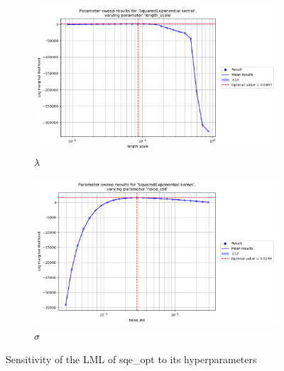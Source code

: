 \documentclass{article}
\begin{document}
\begin{figure}[pht]
\begin{subfigure}{0.45\textwidth}
        \includegraphics[width=\textwidth]{param_sweep/SquaredExponential/Parameter_sweep_results_for__SquaredExponential_kernel_,_varying_parameter__length_scale_.png}
        \caption{$\lambda$}
        \label{fig:sqe length scale}
    \end{subfigure}
    \begin{subfigure}{0.45\textwidth}
        \centering
        \includegraphics[width=\textwidth]{param_sweep/SquaredExponential/Parameter_sweep_results_for__SquaredExponential_kernel_,_varying_parameter__noise_std_.png}
        \caption{$\sigma$}
        \label{fig:sqe noise}
    \end{subfigure}

    \caption{Sensitivity of the LML of sqe\_opt to its hyperparameters}
    \label{fig:sqe sensitivity}
\end{figure}
\end{document}
